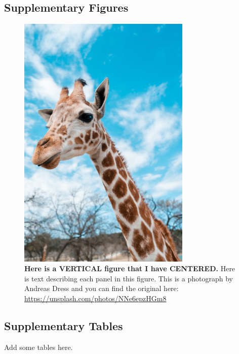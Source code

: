 \documentclass{getwriting}
\begin{document}
\subsection*{Supplementary Figures}
\begin{figure}[H]
\label{fig:supplementaryfigure1}
\begin{center}
\includegraphics[width=3.25in]{supplementaryTest.jpg}
\end{center}
\caption{\textbf{Here is a VERTICAL figure that I have CENTERED.} Here is text describing each panel in this figure. This is a photograph by Andreas Dress and you can find the original here: \url{https://unsplash.com/photos/NNe6epzHGm8}}
\end{figure}
\newpage
\subsection*{Supplementary Tables}
Add some tables here.
\newpage

\end{document}
